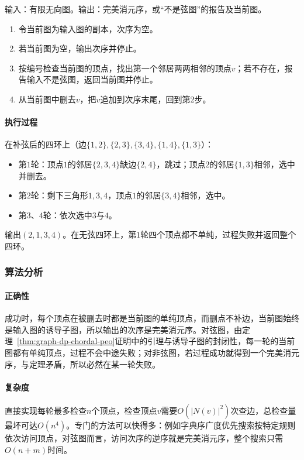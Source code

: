 \begin{algorithm}[逐次删除单纯顶点]
\label{alg:graph-dp-peo-construction}
输入：有限无向图。输出：完美消元序，或“不是弦图”的报告及当前图。
\begin{enumerate}
  \item 令当前图为输入图的副本，次序为空。
  \item 若当前图为空，输出次序并停止。
  \item 按编号检查当前图的顶点，找出第一个邻居两两相邻的顶点$v$；若不存在，报告输入不是弦图，返回当前图并停止。
  \item 从当前图中删去$v$，把$v$追加到次序末尾，回到第2步。
\end{enumerate}
\end{algorithm}

\paragraph{执行过程}
在补弦后的四环上（边$\{1,2\},\allowbreak\{2,3\},\allowbreak\{3,4\},\allowbreak\{1,4\},\allowbreak\{1,3\}$）：
\begin{itemize}
  \item 第$1$轮：顶点$1$的邻居$\{2,3,4\}$缺边$\{2,4\}$，跳过；顶点$2$的邻居$\{1,3\}$相邻，选中并删去。
  \item 第$2$轮：剩下三角形$1,3,4$，顶点$1$的邻居$\{3,4\}$相邻，选中。
  \item 第$3$、$4$轮：依次选中$3$与$4$。
\end{itemize}
输出$(2,1,3,4)$。在无弦四环上，第$1$轮四个顶点都不单纯，过程失败并返回整个四环。

\subsubsection{算法分析}

\paragraph{正确性}
成功时，每个顶点在被删去时都是当前图的单纯顶点，而删点不补边，当前图始终是输入图的诱导子图，所以输出的次序是完美消元序。对弦图，由定理~\ref{thm:graph-dp-chordal-peo}证明中的引理与诱导子图的封闭性，每一轮的当前图都有单纯顶点，过程不会中途失败；对非弦图，若过程成功就得到一个完美消元序，与定理矛盾，所以必然在某一轮失败。

\paragraph{复杂度}
直接实现每轮最多检查$n$个顶点，检查顶点$v$需要$O(|N(v)|^2)$次查边，总检查量最坏可达$O(n^4)$。专门的方法可以快得多：例如字典序广度优先搜索按特定规则依次访问顶点，对弦图而言，访问次序的逆序就是完美消元序，整个搜索只需$O(n+m)$时间。

